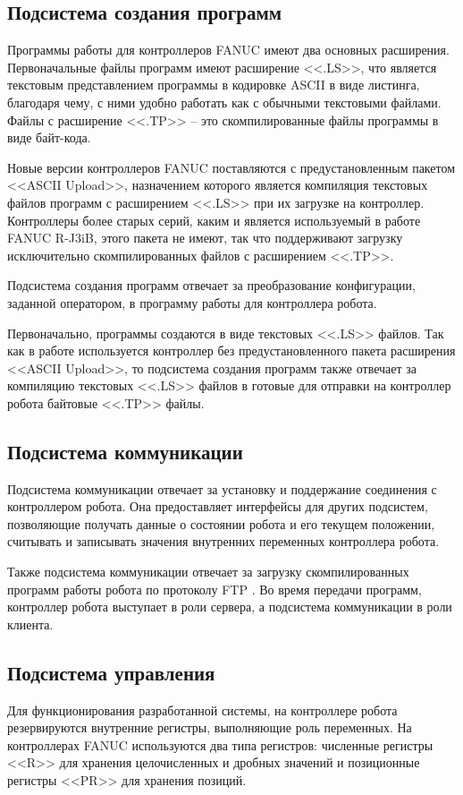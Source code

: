 \subsection{Подсистема создания программ}
Программы работы для контроллеров FANUC имеют два основных расширения.
Первоначальные файлы программ имеют расширение <<.LS>>, что является текстовым представлением программы в кодировке ASCII в виде листинга, благодаря чему, с ними удобно работать как с обычными текстовыми файлами.
Файлы с расширение <<.TP>> -- это скомпилированные файлы программы в виде байт-кода.

Новые версии контроллеров FANUC поставляются с предустановленным пакетом <<ASCII Upload>>, назначением которого является компиляция текстовых файлов программ с расширением <<.LS>> при их загрузке на контроллер.
Контроллеры более старых серий, каким и является используемый в работе FANUC R-J3iB, этого пакета не имеют, так что поддерживают загрузку исключительно скомпилированных файлов с расширением <<.TP>>.

Подсистема создания программ отвечает за преобразование конфигурации, заданной оператором, в программу работы для контроллера робота.

Первоначально, программы создаются в виде текстовых <<.LS>> файлов.
Так как в работе используется контроллер без предустановленного пакета расширения <<ASCII Upload>>, то подсистема создания программ также отвечает за компиляцию текстовых <<.LS>> файлов в готовые для отправки на контроллер робота байтовые <<.TP>> файлы.

\subsection{Подсистема коммуникации}
Подсистема коммуникации отвечает за установку и поддержание соединения с контроллером робота.
Она предоставляет интерфейсы для других подсистем, позволяющие получать данные о состоянии робота и его текущем положении, считывать и записывать значения внутренних переменных контроллера робота.

Также подсистема коммуникации отвечает за загрузку скомпилированных программ работы робота по протоколу FTP .
Во время передачи программ, контроллер робота выступает в роли сервера, а подсистема коммуникации в роли клиента.

\subsection{Подсистема управления}
Для функционирования разработанной системы, на контроллере робота резервируются внутренние регистры, выполняющие роль переменных.
На контроллерах FANUC используются два типа регистров: численные регистры <<R>> для хранения целочисленных и дробных значений и позиционные регистры <<PR>> для хранения позиций.

